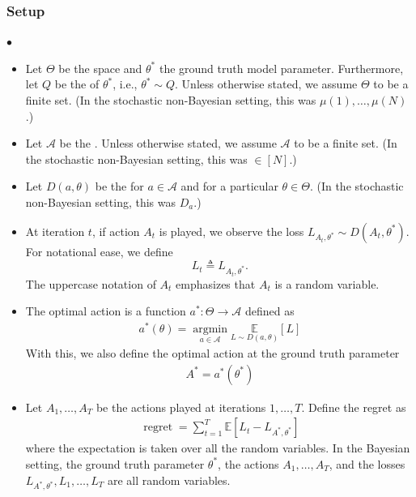 \documentclass{article}
\newcommand{\re}{\operatorname{regret}}
\begin{document}
\subsubsection{Setup}
$\bullet$ 
\begin{itemize}
    \item Let $\Theta$ be the  space and $\theta^{*}$ the ground truth model parameter. Furthermore, let $Q$ be the  of $\theta^{*}$, i.e., $\theta^{*} \sim Q$. Unless otherwise stated, we assume $\Theta$ to be a finite set.
    (In the stochastic non-Bayesian setting, this was $\mu(1), \ldots, \mu(N)$.)
    \item Let $\mathcal{A}$ be the . Unless otherwise stated, we assume $\mathcal{A}$ to be a finite set.
    (In the stochastic non-Bayesian setting, this was $\in[N]$.)
    \item  Let $D(a, \theta)$ be the  for $a \in \mathcal{A}$ and for a particular $\theta \in \Theta$. (In  the stochastic non-Bayesian setting,  this was $D_{a}$.)
    \item At iteration $t$, if action $A_{t}$ is played, we observe the loss $L_{A_{t}, \theta^{*}} \sim D\left(A_{t}, \theta^{*}\right)$. For notational ease, we define $$L_{t} \triangleq L_{A_{t}, \theta^{*}}.$$ The uppercase notation of $A_{t}$ emphasizes that $A_{t}$ is a random variable.
    \item The optimal action is a function $a^{*}: \Theta \rightarrow \mathcal{A}$ defined as
\begin{align*}
a^{*}(\theta)=\underset{a \in \mathcal{A}}{\operatorname{argmin}} \underset{L \sim D(a, \theta)}{\mathbb{E}}[L]
\end{align*}
With this, we also define the optimal action at the ground truth parameter
\begin{align*}
A^{*}=a^{*}\left(\theta^{*}\right)
\end{align*}
\item Let $A_{1}, \ldots, A_{T}$ be the actions played at iterations $1, \ldots, T$. Define the regret as
\begin{align*}
\re=\sum_{t=1}^{T} \mathbb{E}\left[L_{t}-L_{A^{*}, \theta^{*}}\right]
\end{align*}
where the expectation is taken over all the random variables. In the Bayesian setting, the ground truth parameter $\theta^{*}$, the actions $A_{1}, \ldots, A_{T}$, and the losses $L_{A^{*}, \theta^{*}}, L_{1}, \ldots, L_{T}$ are all random variables.
\end{itemize}
\end{document}
